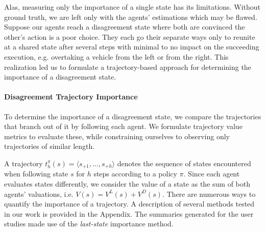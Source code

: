 


Alas, measuring only the importance of a single state has its limitations.
Without ground truth, we are left only with the agents' estimations which may be
flawed. Suppose our agents reach a disagreement state where both are convinced
the other's action is a poor choice. They each go their separate ways only to
reunite at a shared state after several steps with minimal to no impact on the
succeeding execution, e.g. overtaking a vehicle from the left or from the
right. This realization led us to formulate a trajectory-based approach for
determining the importance of a disagreement state. 

\paragraph{Disagreement Trajectory Importance}
To determine the importance of a disagreement state, we compare the trajectories
that branch out of it by following each agent. We formulate trajectory value
metrics to evaluate these, while constraining ourselves to observing only
trajectories of similar length.

A trajectory ${t}_{h}^{\pi}(s) = \langle s_{+1}, ..., s_{+h} \rangle$ denotes
the sequence of states encountered when following state $s$ for $h$ steps
according to a policy $\pi$. Since each agent evaluates states differently, we
consider the value of a state as the sum of both agents' valuations, i.e. $V(s)
= V^{L}(s) + V^{D}(s)$. There are numerous ways to quantify the importance of a
trajectory. A description of several methods tested in our work is provided in
the Appendix. The summaries generated for the user studies made
use of the \emph{last-state} importance method. 



